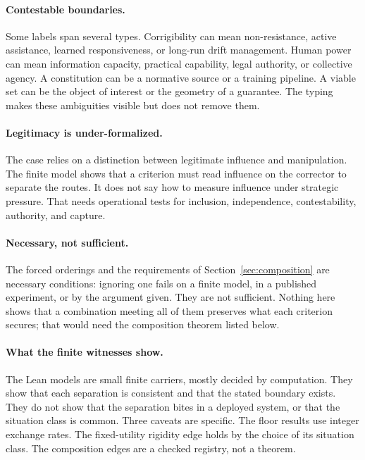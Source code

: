 \documentclass[11pt]{article}
\begin{document}
\paragraph{Contestable boundaries.}
Some labels span several types.
Corrigibility can mean non-resistance, active assistance, learned responsiveness, or long-run drift management.
Human power can mean information capacity, practical capability, legal authority, or collective agency.
A constitution can be a normative source or a training pipeline.
A viable set can be the object of interest or the geometry of a guarantee.
The typing makes these ambiguities visible but does not remove them.

\paragraph{Legitimacy is under-formalized.}
The case relies on a distinction between legitimate influence and manipulation.
The finite model shows that a criterion must read influence on the corrector to separate the routes.
It does not say how to measure influence under strategic pressure.
That needs operational tests for inclusion, independence, contestability, authority, and capture.

\paragraph{Necessary, not sufficient.}
The forced orderings and the requirements of Section~\ref{sec:composition} are necessary conditions: ignoring one fails on a finite model, in a published experiment, or by the argument given.
They are not sufficient.
Nothing here shows that a combination meeting all of them preserves what each criterion secures; that would need the composition theorem listed below.

\paragraph{What the finite witnesses show.}
The Lean models are small finite carriers, mostly decided by computation.
They show that each separation is consistent and that the stated boundary exists.
They do not show that the separation bites in a deployed system, or that the situation class is common.
Three caveats are specific.
The floor results use integer exchange rates.
The fixed-utility rigidity edge holds by the choice of its situation class.
The composition edges are a checked registry, not a theorem.
\end{document}
